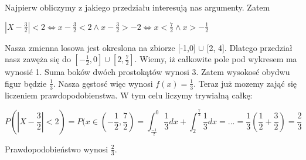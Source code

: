 \begin{zad}
\newline
Najpierw obliczymy z jakiego przedziału interesują nas argumenty. Zatem \newline 
\begin{center} 
	$|X - \frac{3}{2}| < 2 \iff 
	x-\frac{3}{2} < 2 \land x-\frac{3}{2} > -2 \iff  x < \frac{7}{2} \land x> -\frac{1}{2} $	
\newline  
\end{center}

Nasza zmienna losowa jest okreslona na zbiorze [-1,0] $\cup$ [2, 4]. Dlatego przedział nasz zawęża się do  $[-\frac{1}{2}, 0] \cup [2, \frac{7}{2}]$. Wiemy, iż całkowite pole pod wykresem ma wynosić 1. Suma boków dwóch prostokątów wynosi 3. Zatem wysokosć obydwu figur będzie $\frac{1}{3}$. Nasza gęstosć więc wynosi $ f(x) = \frac{1}{3}. $ Teraz już mozemy zająć się liczeniem prawdopodobienstwa. W tym celu liczymy trywialną całkę:

\begin{center}
	$$ P(|X - \frac{3}{2}| < 2) = P(x \in (-\frac{1}{2},\frac{7}{2}) = \int_{\frac{-1}{2}}^{0} \frac{1}{3} dx  + \int_{2}^{\frac{7}{2}}\frac{1}{3} dx = ... = \frac{1}{3}(\frac{1}{2} + \frac{3}{2}) = \frac{2}{3}$$
\end{center}

 Prawdopodobieństwo wynosi $\frac{2}{3}.$
\end{zad}


